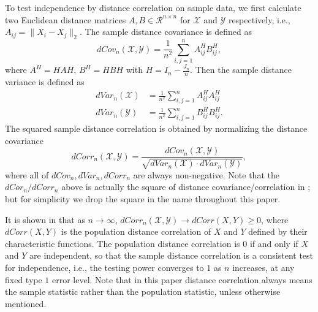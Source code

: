 \documentclass[12pt]{article}
\begin{document}
To test independence by distance correlation on sample data, we first calculate two Euclidean distance matrices $A, B \in \mathcal{R}^{n \times n}$ for $\mathcal{X}$ and $\mathcal{Y}$ respectively, i.e., $A_{ij}=\|X_{i}-X_{j}\|_{2}$. The sample distance covariance is defined as
\begin{equation}
\label{dCovEqu}
dCov_{n}(\mathcal{X},\mathcal{Y})=\frac{1}{n^2}\sum_{i,j=1}^{n}A^{H}_{ij}B^{H}_{ij},
\end{equation}
where $A^{H}=HAH$, $B^{H}=HBH$ with $H=I_{n}-\frac{J_{n}}{n}$. Then the sample distance variance is defined as
\begin{align*}
dVar_{n}(\mathcal{X}) &=\frac{1}{n^2}\sum_{i,j=1}^{n}A^{H}_{ij}A^{H}_{ij}\\
dVar_{n}(\mathcal{Y}) &=\frac{1}{n^2}\sum_{i,j=1}^{n}B^{H}_{ij}B^{H}_{ij}.
\end{align*}
The squared sample distance correlation is obtained by normalizing the distance covariance
\begin{equation}
\label{dCorrEqu}
dCorr_{n}(\mathcal{X},\mathcal{Y})=\frac{dCov_{n}(\mathcal{X},\mathcal{Y})}{\sqrt{dVar_{n}(\mathcal{X}) \cdot dVar_{n}(\mathcal{Y})}},
\end{equation}
where all of $dCov_{n}, dVar_{n}, dCorr_{n}$ are always non-negative. Note that the $dCor_{n}/dCorr_{n}$ above is actually the square of distance covariance/correlation in \cite{SzekelyRizzoBakirov2007}; but for simplicity we drop the square in the name throughout this paper.

It is shown in \cite{SzekelyRizzoBakirov2007} that as $n \rightarrow \infty$, $dCorr_{n}(\mathcal{X},\mathcal{Y}) \rightarrow dCorr(X,Y) \geq 0$, where $dCorr(X,Y)$ is the population distance correlation of $X$ and $Y$ defined by their characteristic functions. The population distance correlation is $0$ if and only if $X$ and $Y$ are independent, so that the sample distance correlation is a consistent test for independence, i.e., the testing power converges to $1$ as $n$ increases, at any fixed type $1$ error level. Note that in this paper distance correlation always means the sample statistic rather than the population statistic, unless otherwise mentioned.
\end{document}
